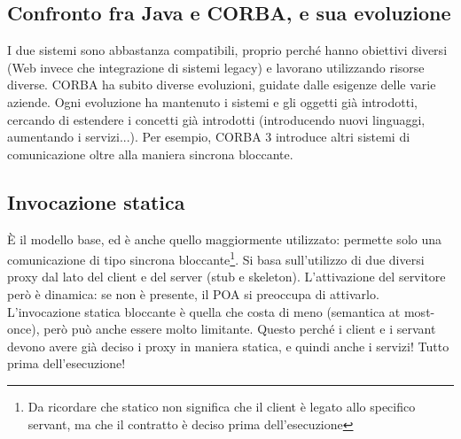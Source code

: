 \subsection{Confronto fra Java e CORBA, e sua evoluzione}
I due sistemi sono abbastanza compatibili, proprio perché hanno obiettivi diversi (Web invece che integrazione di
sistemi legacy) e lavorano utilizzando risorse diverse.
CORBA ha subito diverse evoluzioni, guidate dalle esigenze delle varie aziende.
Ogni evoluzione ha mantenuto i sistemi e gli oggetti già introdotti, cercando di estendere i concetti già introdotti
(introducendo nuovi linguaggi, aumentando i servizi...). Per esempio, CORBA 3 introduce altri sistemi di
comunicazione oltre alla maniera sincrona bloccante.
\subsection{Invocazione statica}
È il modello base, ed è anche quello maggiormente utilizzato: permette solo una comunicazione di tipo sincrona
bloccante\footnote{Da ricordare che statico non significa che il client è legato allo specifico servant, ma che il
contratto è deciso prima dell'esecuzione}. Si basa sull'utilizzo di due diversi proxy dal lato del client e del server
(stub e skeleton). L'attivazione del servitore però è dinamica: se non è presente, il POA si preoccupa di attivarlo.
L'invocazione statica bloccante è quella che costa di meno (semantica at most-once), però può anche essere molto
limitante. Questo perché i client e i servant devono avere già deciso i proxy in maniera statica, e quindi anche i
servizi! Tutto prima dell'esecuzione!
